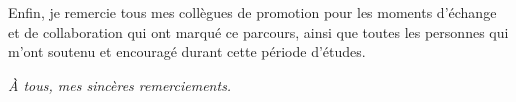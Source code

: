 \vspace{0.7cm}

\noindent
Enfin, je remercie tous mes collègues de promotion pour les moments d'échange et de collaboration qui ont marqué ce parcours, ainsi que toutes les personnes qui m'ont soutenu et encouragé durant cette période d'études.

\vspace{1cm}

\begin{center}
    \textit{À tous, mes sincères remerciements.}
\end{center}

\newpage